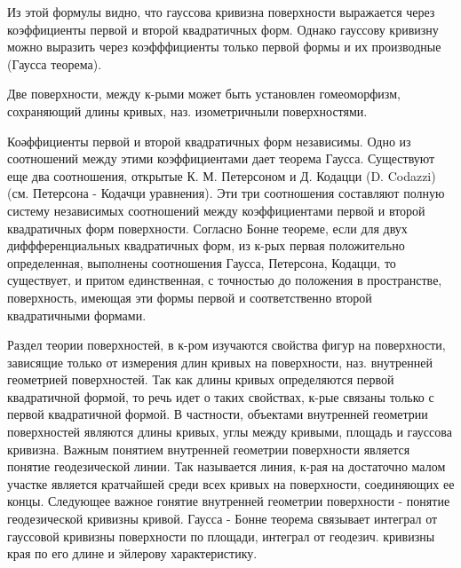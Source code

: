 \documentclass[10pt]{article}
\begin{document}
Из этой формулы видно, что гауссова кривизна поверхности выражается через коэффициенты первой и второй квадратичных форм. Однако гауссову кривизну можно выразить через коэфффициенты только первой формы и их производные (Гаусса теорема).



Две поверхности, между к-рыми может быть установлен гомеоморфизм, сохраняющий длины кривых, наз. изометричныли поверхностями.



Коәффициенты первой и второй квадратичных форм независимы. Одно из соотношений между этими коэффициентами дает теорема Гаусса. Существуют еще два соотношения, открытые К. М. Петерсоном и Д. Кодацци (D. Codazzi) (см. Петерсона - Кодачци уравнения). Эти три соотношения составляют полную систему независимых соотношений между коэффициентами первой и второй квадратичных форм поверхности. Согласно Бонне теореме, если для двух диффференциальных квадратичных форм, из к-рых первая положительно определенная, выполнены соотношения Гаусса, Петерсона, Кодацци, то существует, и притом единственная, с точностью до положения в пространстве, поверхность, имеющая эти формы первой и соответственно второй квадратичными формами.



Раздел теории поверхностей, в к-ром изучаются свойства фигур на поверхности, зависящие только от измерения длин кривых на поверхности, наз. внутренней геометрией поверхностей. Так как длины кривых определяются первой квадратичной формой, то речь идет о таких свойствах, к-рые связаны только с первой квадратичной формой. В частности, объектами внутренней геометрии поверхностей являются длины кривых, углы между кривыми, площадь и гауссова кривизна. Важным понятием внутренней геометрии поверхности является понятие геодезической линии. Так называется линия, к-рая на достаточно малом участке является кратчайшей среди всех кривых на поверхности, соединяющих ее концы. Следующее важное гонятие внутренней геометрии поверхности - понятие геодезической кривизны кривой. Гаусса - Бонне теорема связывает интеграл от гауссовой кривизны поверхности по площади, интеграл от геодезич. кривизны края по его длине и эйлерову характеристику.
\end{document}
